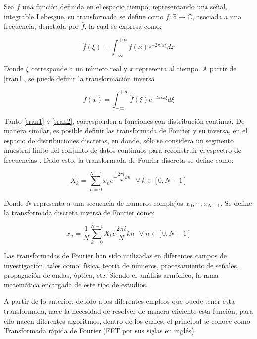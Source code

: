 Sea $f$ una función definida en el espacio tiempo, representando una señal, integrable Lebesgue, su transformada se define como $f: \mathbb{R} \to \mathbb{C}$, asociada a una frecuencia, denotada por $\hat{f}$, la cual se expresa como:

\begin{equation}
	\hat{f}(\xi) = \int_{-\infty}^{+\infty} f(x)e^{-2\pi i x \xi} dx
	\label{tran1}
\end{equation}

Donde $\xi$ corresponde a un número real y $x$ representa al tiempo. A partir de \ref{tran1}, se puede definir la transformación inversa

\begin{equation}
	f(x) = \int_{-\infty}^{+\infty} \hat{f}(\xi) e^{-2\pi i x \xi} d\xi
	\label{tran2}
\end{equation}

Tanto \ref{tran1} y \ref{tran2}, corresponden a funciones con distribución continua. De manera similar, es posible definir las transformada de Fourier y su inversa, en el espacio de distribuciones discretas, en donde, sólo se considera un segmento muestral finito del conjunto de datos continuos para reconstruir el espectro de frecuencias \cite{rao2014discrete}. Dado esto, la transformada de Fourier discreta se define como:

\begin{equation}
	X_k = \sum_{n=0}^{N-1} x_n e^{-\dfrac{2\pi i}{N} kn}\ \ \  \forall\  k \in [0, N-1]
\end{equation} 

Donde $N$ representa a una secuencia de números complejos $x_0, \cdots, x_{N-1}$. Se define la transformada discreta inversa de Fourier como:

\begin{equation}
	x_n = \dfrac{1}{N} \sum_{k=0}^{N-1} X_k e \dfrac{2\pi i}{N} kn \ \ \ \forall \ n \in [0, N-1]
\end{equation}

Las transformadas de Fourier han sido utilizadas en diferentes campos de investigación, tales como: física, teoría de números, procesamiento de señales, propagación de ondas, óptica, etc. Siendo el análisis armónico, la rama matemática encargada de este tipo de estudios.

A partir de lo anterior, debido a los diferentes empleos que puede tener esta transformada, nace la necesidad de resolver de manera eficiente esta función, para ello nacen diferentes algoritmos, dentro de los cuales, el principal se conoce como Transformada rápida de Fourier (FFT por sus siglas en inglés).
 
